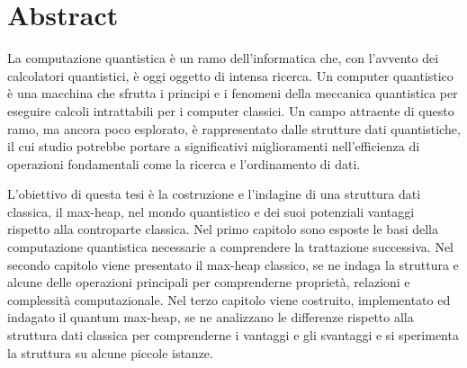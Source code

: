 \chapter*{Abstract}
La computazione quantistica è un ramo dell'informatica che, con l'avvento dei calcolatori quantistici, è oggi oggetto di intensa ricerca. Un computer quantistico è una macchina che sfrutta i principi e i fenomeni della meccanica quantistica per eseguire calcoli intrattabili per i computer classici. Un campo attraente di questo ramo, ma ancora poco esplorato, è rappresentato dalle strutture dati quantistiche, il cui studio potrebbe portare a significativi miglioramenti nell'efficienza di operazioni fondamentali come la ricerca e l'ordinamento di dati.

L'obiettivo di questa tesi è la costruzione e l'indagine di una struttura dati classica, il max-heap, nel mondo quantistico e dei suoi potenziali vantaggi rispetto alla controparte classica. Nel primo capitolo sono esposte le basi della computazione quantistica necessarie a comprendere la trattazione successiva. Nel secondo capitolo viene presentato il max-heap classico, se ne indaga la struttura e alcune delle operazioni principali per comprenderne proprietà, relazioni e complessità computazionale. Nel terzo capitolo viene costruito, implementato ed indagato il quantum max-heap, se ne analizzano le differenze rispetto alla struttura dati classica per comprenderne i vantaggi e gli svantaggi e si sperimenta la struttura su alcune piccole istanze.